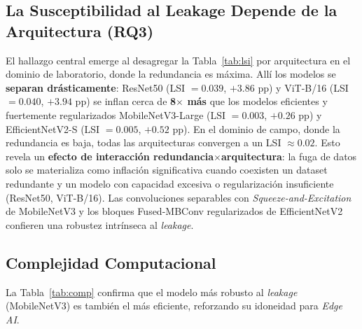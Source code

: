 \documentclass[journal,compsoc]{IEEEtran}
\begin{document}
\subsection{La Susceptibilidad al Leakage Depende de la Arquitectura (RQ3)}
El hallazgo central emerge al desagregar la Tabla~\ref{tab:lsi} por arquitectura en el dominio de laboratorio, donde la redundancia es máxima. Allí los modelos se \textbf{separan drásticamente}: ResNet50 (LSI $=0.039$, $+3.86$ pp) y ViT-B/16 (LSI $=0.040$, $+3.94$ pp) se inflan cerca de \textbf{8$\times$ más} que los modelos eficientes y fuertemente regularizados MobileNetV3-Large (LSI $=0.003$, $+0.26$ pp) y EfficientNetV2-S (LSI $=0.005$, $+0.52$ pp). En el dominio de campo, donde la redundancia es baja, todas las arquitecturas convergen a un LSI $\approx 0.02$. Esto revela un \textbf{efecto de interacción redundancia$\times$arquitectura}: la fuga de datos solo se materializa como inflación significativa cuando coexisten un dataset redundante y un modelo con capacidad excesiva o regularización insuficiente (ResNet50, ViT-B/16). Las convoluciones separables con \textit{Squeeze-and-Excitation} de MobileNetV3 y los bloques Fused-MBConv regularizados de EfficientNetV2 confieren una robustez intrínseca al \textit{leakage}.

\subsection{Complejidad Computacional}
La Tabla~\ref{tab:comp} confirma que el modelo más robusto al \textit{leakage} (MobileNetV3) es también el más eficiente, reforzando su idoneidad para \textit{Edge AI}.
\begin{table}[H]
\centering
\caption{Complejidad Computacional (CPU, batch=1)}
\label{tab:comp}
\end{table}
\end{document}
